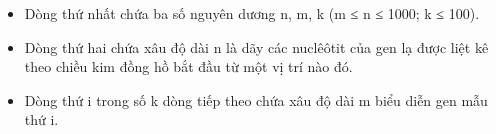 \begin{itemize}
	\item Dòng thứ nhất chứa ba số nguyên dương n, m, k (m ≤ n ≤ 1000; k ≤ 100).
	\item Dòng thứ hai chứa xâu độ dài n là dãy các nuclêôtit của gen lạ được liệt kê theo chiều kim đồng hồ bắt đầu từ một vị trí nào đó.
	\item Dòng thứ i trong số k dòng tiếp theo chứa xâu độ dài m biểu diễn gen mẫu thứ i.
\end{itemize}

\